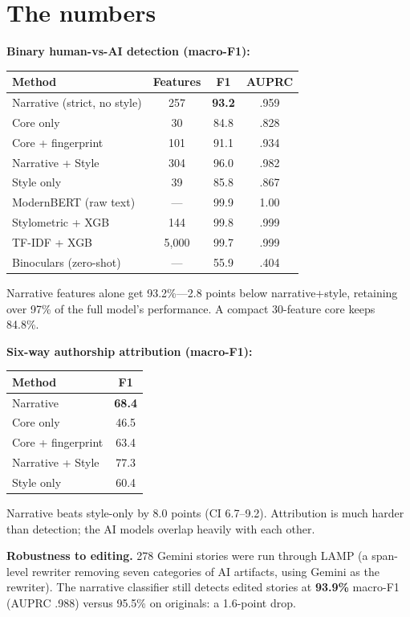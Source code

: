 \documentclass[11pt]{article}
\begin{document}
\section{The numbers}
\textbf{Binary human-vs-AI detection (macro-F1):}
\begin{center}\small
\begin{tabular}{lccc}
\toprule
Method & Features & F1 & AUPRC \\
\midrule
Narrative (strict, no style) & 257 & \textbf{93.2} & .959 \\
Core only & 30 & 84.8 & .828 \\
Core + fingerprint & 101 & 91.1 & .934 \\
Narrative + Style & 304 & 96.0 & .982 \\
Style only & 39 & 85.8 & .867 \\
ModernBERT (raw text) & --- & 99.9 & 1.00 \\
Stylometric + XGB & 144 & 99.8 & .999 \\
TF-IDF + XGB & 5,000 & 99.7 & .999 \\
Binoculars (zero-shot) & --- & 55.9 & .404 \\
\bottomrule
\end{tabular}
\end{center}
Narrative features alone get 93.2\%---2.8 points below narrative+style, retaining over 97\% of the full model's performance. A compact 30-feature core keeps 84.8\%.

\textbf{Six-way authorship attribution (macro-F1):}
\begin{center}\small
\begin{tabular}{lc}
\toprule
Method & F1 \\
\midrule
Narrative & \textbf{68.4} \\
Core only & 46.5 \\
Core + fingerprint & 63.4 \\
Narrative + Style & 77.3 \\
Style only & 60.4 \\
\bottomrule
\end{tabular}
\end{center}
Narrative beats style-only by 8.0 points (CI 6.7--9.2). Attribution is much harder than detection; the AI models overlap heavily with each other.

\textbf{Robustness to editing.} 278 Gemini stories were run through LAMP (a span-level rewriter removing seven categories of AI artifacts, using Gemini as the rewriter). The narrative classifier still detects edited stories at \textbf{93.9\%} macro-F1 (AUPRC .988) versus 95.5\% on originals: a 1.6-point drop.
\end{document}
